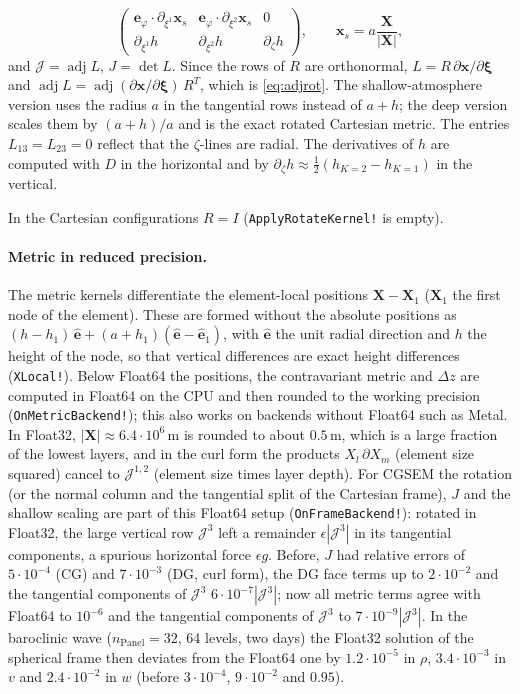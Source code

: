 \documentclass[11pt,a4paper]{article}
\newcommand{\Jm}{\mathcal{J}}
\newcommand{\code}[1]{\texttt{#1}}
\begin{document}
\begin{itemize}
\begin{equation}
\begin{pmatrix}
      \bm e_\varphi\cdot\partial_{\xi^1}\bm x_s & \bm e_\varphi\cdot\partial_{\xi^2}\bm x_s & 0\\
      \partial_{\xi^1} h & \partial_{\xi^2} h & \partial_\zeta h
    \end{pmatrix},\qquad \bm x_s = a\frac{\bm X}{|\bm X|},
    \label{eq:Lsph}
  \end{equation}
  and $\Jm = \operatorname{adj}L$, $J = \det L$. Since the rows of $R$ are
  orthonormal, $L = R\,\partial\bm x/\partial\bm\xi$ and
  $\operatorname{adj}L = \operatorname{adj}(\partial\bm x/\partial\bm\xi)\,R^T$,
  which is \eqref{eq:adjrot}. The shallow-atmosphere version uses the radius
  $a$ in the tangential rows instead of $a+h$; the deep version scales them
  by $(a+h)/a$ and is the exact rotated Cartesian metric. The entries $L_{13} = L_{23} = 0$ reflect that
  the $\zeta$-lines are radial. The derivatives of $h$ are computed with $D$
  in the horizontal and by
  $\partial_\zeta h \approx \tfrac12(h_{K=2}-h_{K=1})$ in the vertical.
\end{itemize}
In the Cartesian configurations $R = I$ (\code{ApplyRotateKernel!} is
empty).

\paragraph{Metric in reduced precision.}
The metric kernels differentiate the element-local positions
$\bm X - \bm X_1$ ($\bm X_1$ the first node of the element). These are formed
without the absolute positions as
$(h-h_1)\,\hat{\bm e} + (a+h_1)(\hat{\bm e}-\hat{\bm e}_1)$, with $\hat{\bm e}$ the
unit radial direction and $h$ the height of the node, so that vertical
differences are exact height differences (\code{XLocal!}). Below Float64 the
positions, the contravariant metric and $\Delta z$ are computed in Float64 on the
CPU and then rounded to the working precision (\code{OnMetricBackend!}); this
also works on backends without Float64 such as Metal. In Float32,
$|\bm X|\approx 6.4\cdot10^6\,$m is rounded to about $0.5\,$m, which is a large
fraction of the lowest layers, and in the curl form the products
$X_l\,\partial X_m$ (element size squared) cancel to $\Jm^{1,2}$ (element size
times layer depth). For CGSEM the rotation (or the normal column and the tangential split of the
Cartesian frame), $J$ and the shallow scaling are part of this Float64 setup
(\code{OnFrameBackend!}): rotated in Float32, the large vertical row $\Jm^3$ left
a remainder $\epsilon|\Jm^3|$ in its tangential components, a spurious horizontal
force $\epsilon g$. Before, $J$ had relative errors of $5\cdot10^{-4}$ (CG) and
$7\cdot10^{-3}$ (DG, curl form), the DG face terms up to $2\cdot10^{-2}$ and the
tangential components of $\Jm^3$ $6\cdot10^{-7}|\Jm^3|$; now all metric terms
agree with Float64 to $10^{-6}$ and the tangential components of $\Jm^3$ to
$7\cdot10^{-9}|\Jm^3|$. In the baroclinic wave ($n_{\text{Panel}}=32$, 64 levels,
two days) the Float32 solution of the spherical frame then deviates from the
Float64 one by $1.2\cdot10^{-5}$ in $\rho$, $3.4\cdot10^{-3}$ in $v$ and $2.4\cdot10^{-2}$
in $w$ (before $3\cdot10^{-4}$, $9\cdot10^{-2}$ and $0.95$).
\end{document}
